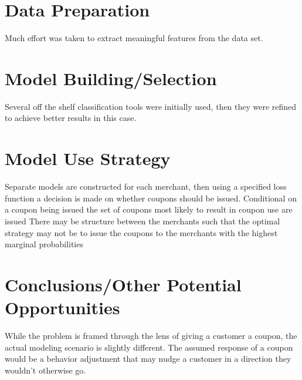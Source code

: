 \documentclass[12pt]{article} %
\begin{document}
\section{Data Preparation}
Much effort was taken to extract meaningful features from the data set.
\section{Model Building/Selection}
Several off the shelf classification tools were initially used, then they were refined to achieve better results in this case.
\section{Model Use Strategy}
Separate models are constructed for each merchant, then using a specified loss function a decision is made on whether coupons should be issued.  Conditional on a coupon being issued the set of coupons most likely to result in coupon use are issued \ac{There may be structure between the merchants such that the optimal strategy may not be to issue the coupons to the merchants with the highest marginal probabilities} 
\section{Conclusions/Other Potential Opportunities}
While the problem is framed through the lens of giving a customer a coupon, the actual modeling scenario is slightly different.  The assumed response of a coupon would be a behavior adjustment that may nudge a customer in a direction they wouldn't otherwise go.  
\end{document}

